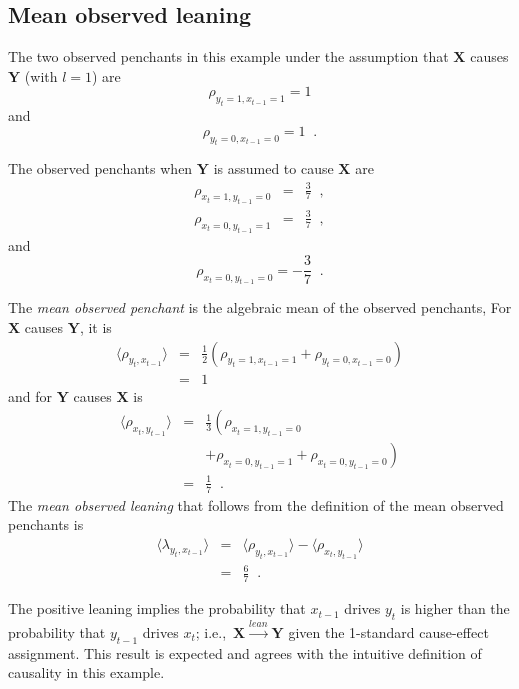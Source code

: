 \documentclass[twocolumn,aps,pre,groupedaddress]{revtex4-1}
\begin{document}
\subsection{Mean observed leaning}
\label{sec:meanlean}

The two observed penchants in this example under the assumption that $\mathbf{X}$ causes $\mathbf{Y}$ (with $l=1$) are
\begin{equation}
\label{eqn:rhoex1}
\rho_{y_t=1,x_{t-1}=1}=1
\end{equation}
and
\begin{equation*}
\rho_{y_t=0,x_{t-1}=0}=1\;\;.
\end{equation*}

The observed penchants when $\mathbf{Y}$ is assumed to cause $\mathbf{X}$ are
\begin{eqnarray*}
\rho_{x_t=1,y_{t-1}=0} &=& \frac{3}{7}\;\;,\\
\rho_{x_t=0,y_{t-1}=1} &=& \frac{3}{7}\;\;,
\end{eqnarray*}
and
\begin{equation*}
\rho_{x_t=0,y_{t-1}=0}=-\frac{3}{7}\;\;.
\end{equation*}

The {\em mean observed penchant} is the algebraic mean of the observed penchants,  For $\mathbf{X}$ causes $\mathbf{Y}$, it is
\begin{eqnarray*}
\langle \rho_{y_t,x_{t-1}} \rangle &=& \frac{1}{2}\left(\rho_{y_t=1,x_{t-1}=1} + \rho_{y_t=0,x_{t-1}=0}\right)\\
&=& 1
\end{eqnarray*}
and for $\mathbf{Y}$ causes $\mathbf{X}$ is
\begin{eqnarray*}
\langle \rho_{x_t,y_{t-1}} \rangle &=& \frac{1}{3}\left(\rho_{x_t=1,y_{t-1}=0} \right.\\
& &\left. +\rho_{x_t=0,y_{t-1}=1} + \rho_{x_t=0,y_{t-1}=0}\right)\\
&=& \frac{1}{7}\;\;.
\end{eqnarray*}
The {\em mean observed leaning} that follows from the definition of the mean observed penchants is
\begin{eqnarray}
\label{eqn:meanlean}
\langle \lambda_{y_t,x_{t-1}} \rangle &=& \langle \rho_{y_t,x_{t-1}} \rangle - \langle \rho_{x_t,y_{t-1}} \rangle\\
&=& \frac{6}{7}\;\;.
\end{eqnarray}

The positive leaning implies the probability that $x_{t-1}$ drives $y_t$ is higher than the probability that $y_{t-1}$ drives $x_{t}$; i.e.,\ $\mathbf{X}\xrightarrow{lean}\mathbf{Y}$ given the 1-standard cause-effect assignment.  This result is expected and agrees with the intuitive definition of causality in this example.  
\end{document}
